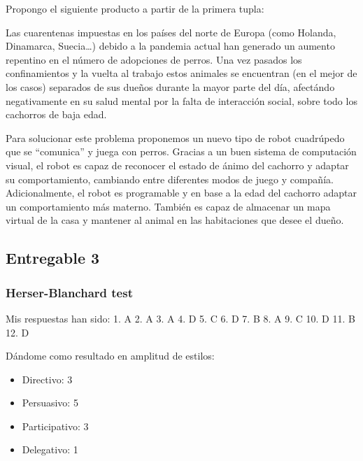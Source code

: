 \vspace{\baselineskip}

Propongo el siguiente producto a partir de la primera tupla:

\vspace{\baselineskip}

Las cuarentenas impuestas en los países del norte de Europa (como Holanda, Dinamarca, Suecia\dots) debido a la pandemia actual han generado un aumento repentino en el número de adopciones de perros. 
Una vez pasados los confinamientos y la vuelta al trabajo estos animales se encuentran (en el mejor de los casos) separados de sus dueños durante la mayor parte del día, afectándo negativamente en su salud mental por la falta de interacción social, sobre todo los cachorros de baja edad.

\vspace{\baselineskip}

Para solucionar este problema proponemos un nuevo tipo de robot cuadrúpedo que se ``comunica'' y juega con perros. Gracias a un buen sistema de computación visual, el robot es capaz de reconocer el estado de ánimo del cachorro y adaptar su comportamiento, cambiando entre diferentes modos de juego y compañía. Adicionalmente, el robot es programable y en base a la edad del cachorro adaptar un comportamiento más materno. También es capaz de almacenar un mapa virtual de la casa y mantener al animal en las habitaciones que desee el dueño.


\subsection{Entregable 3}

\subsubsection{Herser-Blanchard test}

Mis respuestas han sido: 1. A 2. A 3. A 4. D 5. C 6. D 7. B 8. A 9. C 10. D 11. B 12. D

Dándome como resultado en amplitud de estilos:
\begin{itemize}
    \item Directivo: 3
    \item Persuasivo: 5
    \item Participativo: 3
    \item Delegativo: 1
\end{itemize}

